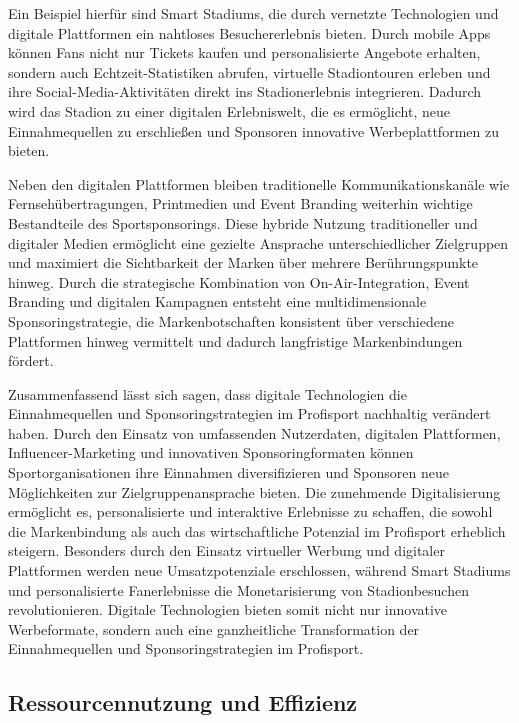\documentclass[
  number]{elsarticle}
\begin{document}
Ein Beispiel hierfür sind Smart Stadiums, die durch vernetzte
Technologien und digitale Plattformen ein nahtloses Besuchererlebnis
bieten. Durch mobile Apps können Fans nicht nur Tickets kaufen und
personalisierte Angebote erhalten, sondern auch Echtzeit-Statistiken
abrufen, virtuelle Stadiontouren erleben und ihre
Social-Media-Aktivitäten direkt ins Stadionerlebnis integrieren. Dadurch
wird das Stadion zu einer digitalen Erlebniswelt, die es ermöglicht,
neue Einnahmequellen zu erschließen und Sponsoren innovative
Werbeplattformen zu bieten. \citep[pp.~29-39]{Tobeck_Stadion}

Neben den digitalen Plattformen bleiben traditionelle
Kommunikationskanäle wie Fernsehübertragungen, Printmedien und Event
Branding weiterhin wichtige Bestandteile des Sportsponsorings. Diese
hybride Nutzung traditioneller und digitaler Medien ermöglicht eine
gezielte Ansprache unterschiedlicher Zielgruppen und maximiert die
Sichtbarkeit der Marken über mehrere Berührungspunkte hinweg. Durch die
strategische Kombination von On-Air-Integration, Event Branding und
digitalen Kampagnen entsteht eine multidimensionale Sponsoringstrategie,
die Markenbotschaften konsistent über verschiedene Plattformen hinweg
vermittelt und dadurch langfristige Markenbindungen fördert.
\citep[pp.~27-30]{Rödinger_Trikotwerbung}

Zusammenfassend lässt sich sagen, dass digitale Technologien die
Einnahmequellen und Sponsoringstrategien im Profisport nachhaltig
verändert haben. Durch den Einsatz von umfassenden Nutzerdaten,
digitalen Plattformen, Influencer-Marketing und innovativen
Sponsoringformaten können Sportorganisationen ihre Einnahmen
diversifizieren und Sponsoren neue Möglichkeiten zur
Zielgruppenansprache bieten. Die zunehmende Digitalisierung ermöglicht
es, personalisierte und interaktive Erlebnisse zu schaffen, die sowohl
die Markenbindung als auch das wirtschaftliche Potenzial im Profisport
erheblich steigern. Besonders durch den Einsatz virtueller Werbung und
digitaler Plattformen werden neue Umsatzpotenziale erschlossen, während
Smart Stadiums und personalisierte Fanerlebnisse die Monetarisierung von
Stadionbesuchen revolutionieren. Digitale Technologien bieten somit
nicht nur innovative Werbeformate, sondern auch eine ganzheitliche
Transformation der Einnahmequellen und Sponsoringstrategien im
Profisport.

\subsection{Ressourcennutzung und
Effizienz}\label{ressourcennutzung-und-effizienz}
\end{document}
